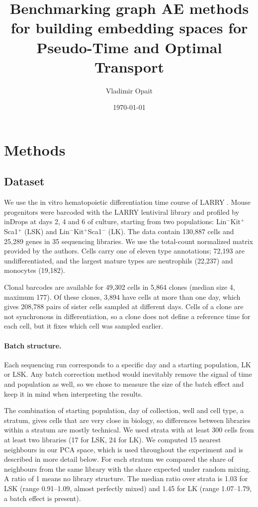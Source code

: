 \documentclass[12pt,a4paper]{article}
\title{Benchmarking graph AE methods for building embedding spaces for Pseudo-Time and Optimal Transport}
\author{Vladimir Opait}
\date{\today}
\begin{document}
\maketitle

\section{Methods}

\subsection{Dataset}
We use the in vitro hematopoietic differentiation time course of LARRY \cite{weinreb2020lineage}.
Mouse progenitors were barcoded with the LARRY lentiviral library and profiled by inDrops at
days 2, 4 and 6 of culture, starting from two populations: Lin$^-$Kit$^+$Sca1$^+$ (LSK) and
Lin$^-$Kit$^+$Sca1$^-$ (LK). The data contain 130{,}887 cells and 25{,}289 genes in 35 sequencing
libraries. We use the total-count normalized matrix provided by the authors. Cells carry one of
eleven type annotations; 72{,}193 are undifferentiated, and the largest mature types are
neutrophils (22{,}237) and monocytes (19{,}182).

Clonal barcodes are available for 49{,}302 cells in 5{,}864 clones (median size 4, maximum 177).
Of these clones, 3{,}894 have cells at more than one day, which gives 208{,}788 pairs of
sister cells sampled at different days. Cells of a clone are not synchronous in differentiation,
so a clone does not define a reference time for each cell, but it fixes which cell was sampled
earlier.

\paragraph{Batch structure.}
Each sequencing run corresponds to a specific day and a starting population, LK or LSK. Any
batch correction method would inevitably remove the signal of time and population as well, so
we chose to measure the size of the batch effect and keep it in mind when interpreting the
results.

The combination of starting population, day of collection, well and cell type, a stratum, gives
cells that are very close in biology, so differences between libraries within a stratum are
mostly technical. We used strata with at least 300 cells from at least two libraries (17 for LSK,
24 for LK). We computed 15 nearest neighbours in our PCA space, which is used throughout the
experiment and is described in more detail below. For each stratum we compared the share of
neighbours from the same library with the share expected under random mixing. A ratio of 1 means
no library structure. The median ratio over strata is 1.03 for LSK (range 0.91--1.09, almost
perfectly mixed) and 1.45 for LK (range 1.07--1.79, a batch effect is present).
\end{document}
